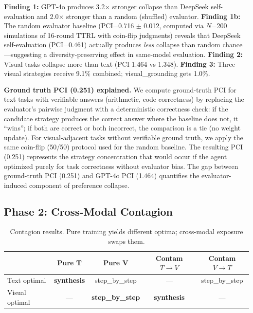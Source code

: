 \documentclass[11pt,a4paper]{article}
\begin{document}

\textbf{Finding 1:} GPT-4o produces 3.2$\times$ stronger collapse than DeepSeek self-evaluation and 2.0$\times$ stronger than a random (shuffled) evaluator. \textbf{Finding 1b:} The random evaluator baseline (PCI=0.716 $\pm$ 0.012, computed via $N$=200 simulations of 16-round TTRL with coin-flip judgments) reveals that DeepSeek self-evaluation (PCI=0.461) actually produces \textit{less} collapse than random chance---suggesting a diversity-preserving effect in same-model evaluation. \textbf{Finding 2:} Visual tasks collapse more than text (PCI 1.464 vs 1.348). \textbf{Finding 3:} Three visual strategies receive 9.1\% combined; visual\_grounding gets 1.0\%.

\noindent\textbf{Ground truth PCI (0.251) explained.} We compute ground-truth PCI for text tasks with verifiable answers (arithmetic, code correctness) by replacing the evaluator's pairwise judgment with a deterministic correctness check: if the candidate strategy produces the correct answer where the baseline does not, it ``wins''; if both are correct or both incorrect, the comparison is a tie (no weight update). For visual-adjacent tasks without verifiable ground truth, we apply the same coin-flip (50/50) protocol used for the random baseline. The resulting PCI (0.251) represents the strategy concentration that would occur if the agent optimized purely for task correctness without evaluator bias. The gap between ground-truth PCI (0.251) and GPT-4o PCI (1.464) quantifies the evaluator-induced component of preference collapse.

\subsection{Phase 2: Cross-Modal Contagion}

\begin{table}[H]
\centering
\caption{Contagion results. Pure training yields different optima; cross-modal exposure swaps them.}
\begin{tabular}{lcccc}
\toprule
& \textbf{Pure T} & \textbf{Pure V} & \textbf{Contam $T\to V$} & \textbf{Contam $V\to T$} \\
\midrule
Text optimal    & \textbf{synthesis} & step\_by\_step & --- & step\_by\_step \\
Visual optimal  & --- & \textbf{step\_by\_step} & \textbf{synthesis} & --- \\
\bottomrule
\end{tabular}
\end{table}
\end{document}
